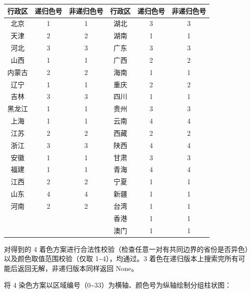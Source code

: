 \begin{center}
\fontsize{8.5pt}{11pt}\selectfont
\renewcommand{\arraystretch}{1.15}
\begin{tabular}{|c|c|c||c|c|c|}
\hline
\textbf{行政区} & \textbf{递归色号} & \textbf{非递归色号} & \textbf{行政区} & \textbf{递归色号} & \textbf{非递归色号} \\ \hline
北京   & 1 & 1 & 湖北   & 3 & 3 \\ \hline
天津   & 2 & 2 & 湖南   & 1 & 1 \\ \hline
河北   & 3 & 3 & 广东   & 3 & 3 \\ \hline
山西   & 1 & 1 & 广西   & 2 & 2 \\ \hline
内蒙古 & 2 & 2 & 海南   & 1 & 1 \\ \hline
辽宁   & 1 & 1 & 重庆   & 2 & 2 \\ \hline
吉林   & 3 & 3 & 四川   & 1 & 1 \\ \hline
黑龙江 & 1 & 1 & 贵州   & 3 & 3 \\ \hline
上海   & 1 & 1 & 云南   & 4 & 4 \\ \hline
江苏   & 2 & 2 & 西藏   & 2 & 2 \\ \hline
浙江   & 3 & 3 & 陕西   & 4 & 4 \\ \hline
安徽   & 1 & 1 & 甘肃   & 3 & 3 \\ \hline
福建   & 1 & 1 & 青海   & 4 & 4 \\ \hline
江西   & 2 & 2 & 宁夏   & 1 & 1 \\ \hline
山东   & 4 & 4 & 新疆   & 1 & 1 \\ \hline
河南   & 2 & 2 & 台湾   & 1 & 1 \\ \hline
 &   &   & 香港   & 1 & 1 \\ \hline
 &   &   & 澳门   & 1 & 1 \\ \hline
\end{tabular}
\end{center}
\noindent\hspace*{2em}对得到的 4 着色方案进行合法性校验（检查任意一对有共同边界的省份是否异色）以及颜色取值范围校验（仅取 1\~{}4），均通过。3 着色在递归版本上搜索完所有可能后返回无解，非递归版本同样返回 None。\par
\noindent\hspace*{2em}将 4 染色方案以区域编号（0\~{}33）为横轴、颜色号为纵轴绘制分组柱状图：\par
